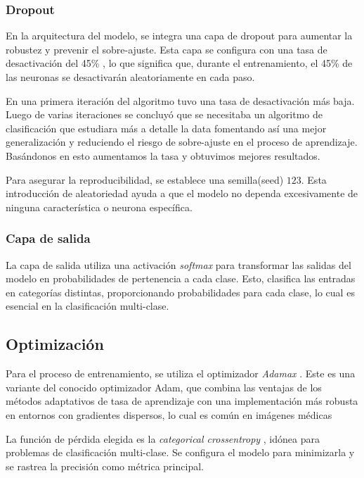 \subsubsection{Dropout}

En la arquitectura del modelo, se integra una capa de dropout para aumentar la robustez y prevenir el sobre-ajuste. Esta capa se configura con una tasa de desactivación del 45\% , lo que significa que, durante el entrenamiento, el 45\% de las neuronas se desactivarán aleatoriamente en cada paso. 

En una primera iteración del algoritmo tuvo una tasa de desactivación más baja. Luego de varias iteraciones se concluyó que se necesitaba un algoritmo de clasificación que estudiara más a detalle la data fomentando así una mejor generalización y reduciendo el riesgo de sobre-ajuste en el proceso de aprendizaje. Basándonos en esto aumentamos la tasa y obtuvimos mejores resultados.

Para asegurar la reproducibilidad, se establece una semilla(seed) $123$. Esta introducción de aleatoriedad ayuda a que el modelo no dependa excesivamente de ninguna característica o neurona específica. 

\subsubsection{Capa de salida}

La capa de salida utiliza una activación \textit{softmax} para transformar las salidas del modelo en probabilidades de pertenencia a cada clase. Esto, clasifica las entradas en categorías distintas, proporcionando probabilidades para cada clase, lo cual es esencial en la clasificación multi-clase.

\subsection{Optimización}

Para el proceso de entrenamiento, se utiliza el optimizador \textit{Adamax} . Este es una variante del conocido optimizador Adam, que combina las ventajas de los métodos adaptativos de tasa de aprendizaje con una implementación más robusta en entornos con gradientes dispersos, lo cual es común en imágenes médicas 

La función de pérdida elegida es la \textit{categorical crossentropy} , idónea para problemas de clasificación multi-clase. Se configura el modelo para minimizarla y se rastrea la precisión como métrica principal.

